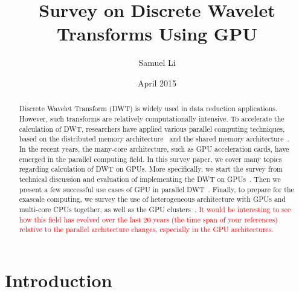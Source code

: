 \documentclass{article}
\title{Survey on Discrete Wavelet Transforms Using GPU}
\author{Samuel Li}
\date{April 2015}
\newcommand{\fix}[1]{\textcolor{red}{#1}} %
\begin{document}
\maketitle

\begin{abstract}
Discrete Wavelet Transform (DWT) is widely used in data reduction applications.
%
However, such transforms are relatively computationally intensive.
%
To accelerate the calculation of DWT, researchers have applied various parallel
computing techniques, based on the distributed memory architecture~\cite{
chadha2002scalable, woo1995parallel, uhl1996wavelet, nielsen1997scalable}
and the shared memory architecture~\cite{
lucka2000parallel, uhl2000optimization,kutil1999hardware}.
%
In the recent years, the many-core architecture, such as GPU acceleration 
cards, have emerged in the parallel computing field.
%
In this survey paper, we cover many topics regarding calculation of DWT on GPUs.
%
More specifically, we start the survey from technical discussion and evaluation
of implementing the DWT on GPUs~\cite{tenllado2008parallel, van2011accelerating,
garcia2005gpu}.
%
Then we present a few successful use cases of GPU in parallel DWT~\cite{
strengert2004hierarchical, strengert2006pyramid, wong2007discrete,
treib2012turbulence}.
%
Finally, to prepare for the exascale computing, we survey the use of 
heterogeneous architecture with GPUs and multi-core CPUs together,
as well as the GPU clusters~\cite{franco2009parallel, franco2010parallel,
strengert2005large, franco20122d, rossinelli2011multicore}.
%
\fix{It would be interesting to see how this
field has evolved over the last 20 years (the time span of your
references) relative to the parallel architecture changes, especially in
the GPU architectures.}
\end{abstract}

\section{Introduction}




\end{document}

